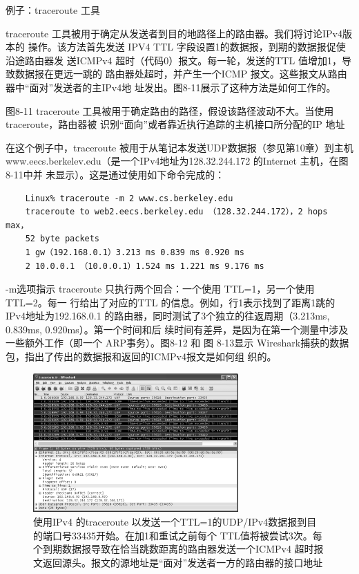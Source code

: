 例子：traceroute 工具

traceroute 工具被用于确定从发送者到目的地路径上的路由器。我们将讨论IPv4版本的
操作。该方法首先发送 IPV4 TTL 字段设置1的数据报，到期的数据报促使沿途路由器发
送ICMPv4 超时（代码0）报文。每一轮，发送的TTL 值增加1，导致数据报在更远一跳的
路由器处超时，并产生一个ICMP 报文。这些报文从路由器中“面对”发送者的主IPv4地
址发出。图8-11展示了这种方法是如何工作的。


图8-11
traceroute 工具被用于确定路由的路径，假设该路径波动不大。当使用 traceroute，路由器被
识别“面向”或者靠近执行追踪的主机接口所分配的IP 地址

在这个例子中，traceroute 被用于从笔记本发送UDP数据报（参见第10章）到主机
www.eecs.berkelev.edu（是一个IPv4地址为128.32.244.172 的Internet 主机，在图8-11中并
未显示）。这是通过使用如下命令完成的：

\begin{verbatim}
	Linux% traceroute -m 2 www.cs.berkeley.edu
	traceroute to web2.eecs.berkeley.edu （128.32.244.172），2 hops max，
	52 byte packets
	1 gw（192.168.0.1）3.213 ms 0.839 ms 0.920 ms
	2 10.0.0.1 （10.0.0.1）1.524 ms 1.221 ms 9.176 ms
\end{verbatim}

-m选项指示 traceroute 只执行两个回合：一个使用 TTL=1，另一个使用TTL=2。每一
行给出了对应的TTL 的信息。例如，行1表示找到了距离1跳的IPv4地址为192.168.0.1
的路由器，同时测试了3个独立的往返周期（3.213ms, 0.839ms, 0.920ms）。第一个时间和后
续时间有差异，是因为在第一个测量中涉及一些额外工作（即一个 ARP事务）。图8-12 和
图 8-13显示 Wireshark捕获的数据包，指出了传出的数据报和返回的ICMPv4报文是如何组
织的。

\begin{figure}[!htb]
	\centering
	\includegraphics[width=0.7\textwidth]{imgs/8/8-12.png}
	\caption{使用IPv4 的traceroute 以发送一个TTL=1的UDP/IPv4数据报到目的端口号33435开始。在加1和重试之前每个 TTL值将被尝试3次。每个到期数据报导致在恰当跳数距离的路由器发送一个ICMPv4 超时报文返回源头。报文的源地址是“面对”发送者一方的路由器的接口地址}
\end{figure}

